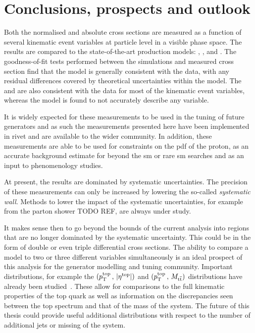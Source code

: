 \chapter{Conclusions, prospects and outlook}
\label{ch:outlook}

Both the normalised and absolute cross sections are measured as a function of several kinematic event variables at particle level in a visible phase space.
The results are compared to the state-of-the-art \ttbar{} production models: \powhegpythia{}, \powhegherwig{}, \mgamcMLMpythia{} and \mgamcFxFxpythia{}.
The goodness-of-fit tests performed between the simulations and measured cross section find that the \powhegpythia{} model is generally consistent with the data, with any residual differences covered by theoretical uncertainties within the model.
The \powhegherwig{} and \mgamcFxFxpythia{} are also consistent with the data for most of the kinematic event variables, whereas the \mgamcMLMpythia{} model is found to not accurately describe any variable.

It is widely expected for these measurements to be used in the tuning of future \ttbar{} generators and as such the measurements presented here have been implemented in \acrshort{rivet} and are available to the wider community. 
In addition, these measurements are able to be used for constraints on the \acrshort{pdf} of the proton, as an accurate background estimate for beyond the \acrshort{sm} or rare \acrshort{sm} searches and as an input to phenomenology studies.

At present, the results are dominated by systematic uncertainties.
The precision of these measurements can only be increased by lowering the so-called \textit{systematic wall}.
Methods to lower the impact of the systematic uncertainties, for example from the parton shower TODO REF, are always under study.

It makes sense then to go beyond the bounds of the current analysis into regions that are no longer dominated by the systematic uncertainty.
This could be in the form of double or even triple differential cross sections.
The ability to compare a model to two or three different variables simultaneously is an ideal prospect of this analysis for the \ttbar{} generator modelling and tuning community.
Important distributions, for example the $(p_{\mathrm{T}}^{\mathrm{top}}\,,\,\lvert \eta^{\mathrm{top}} \rvert)$ and $(p_{\mathrm{T}}^{\mathrm{top}}\,,\,M_{\mathrm{t}\overline{\mathrm{t}}})$ distributions have already been studied~\cite{TOP17002}.
These allow for comparisons to the full kinematic properties of the top quark as well as information on the discrepancies seen between the top \pt{} spectrum and that of the mass of the \ttbar{} system.
The future of this thesis could provide useful additional distributions with respect to the number of additional jets or missing \pt{} of the system.

